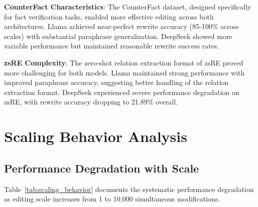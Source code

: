 \textbf{CounterFact Characteristics}: The CounterFact dataset, designed specifically for fact verification tasks, enabled more effective editing across both architectures. Llama achieved near-perfect rewrite accuracy (85-100\% across scales) with substantial paraphrase generalization. DeepSeek showed more variable performance but maintained reasonable rewrite success rates.

\textbf{zsRE Complexity}: The zero-shot relation extraction format of zsRE proved more challenging for both models. Llama maintained strong performance with improved paraphrase accuracy, suggesting better handling of the relation extraction format. DeepSeek experienced severe performance degradation on zsRE, with rewrite accuracy dropping to 21.89\% overall.

\section{Scaling Behavior Analysis}
\label{sec:scaling_analysis}

\subsection{Performance Degradation with Scale}
\label{subsec:performance_degradation}

Table~\ref{tab:scaling_behavior} documents the systematic performance degradation as editing scale increases from 1 to 10,000 simultaneous modifications.

